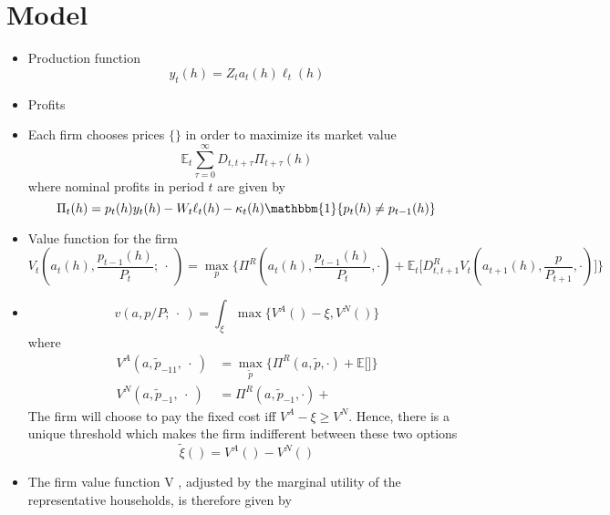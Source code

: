 \documentclass[a4paper,10pt]{article}  %
\begin{document}
\section{Model} %
\label{sec:model}
\begin{itemize}
   \item Production function
   \begin{equation}
      \label{eq:model_eq1}
      y_t(h) = Z_t a_t(h) \ell_t(h)
   \end{equation}

   \item Profits
   
   \item Each firm chooses prices $ \{\} $ in order to maximize its market value
   \begin{equation}
      \label{eq:model_eq}
      \mathbb{E}_t \sum_{\tau=0}^{\infty} D_{t,t+\tau} \Pi_{t+\tau} (h)
   \end{equation}
   where nominal profits in period $ t $ are given by
   \begin{equation}
      \label{eq:model_eq3}
      \Pi_t(h) = p_t(h) y_t(h) - W_t \ell_t(h) - \kappa_t(h) \mathbbm{1}\{p_t(h) \ne p_{t-1}(h)\}
   \end{equation}
   \item Value function for the firm
   \[
      V_t \left( a_t(h), \frac{ p_{t-1}(h) }{ P_t }; \ \cdot \ \right) = 
      \max_{p} 
      \bigg\{
         \Pi^R \left( a_t(h), \frac{ p_{t-1}(h) }{ P_t }, \cdot \right) + 
         \mathbb{E}_t \bigg[ D^R_{t,t+1} V_t \left( a_{t+1}(h), \frac{ p }{ P_{t+1} }, \cdot \right) \bigg]
      \bigg\}
   \]

   \item 
   \[
      v(a, p/P; \ \cdot \ ) = \int_{\xi} \max \Big\{ V^A(  ) - \xi , V^N( )  \Big\}
   \]
   where
   \begin{equation}
      \label{eq:model_eq4}
      \begin{split}
      V^A(a, \tilde{p}_{-11}, \ \cdot \ ) & = \max_{\tilde{p}} 
         \bigg\{ 
            \Pi^R \left( a, \tilde{p}, \cdot \right) + 
            \mathbb{E} \bigg[  \bigg]
         \bigg\} \\
      V^N(a, \tilde{p}_{-1}, \ \cdot \ ) & = 
          \Pi^R \left( a, \tilde{p}_{-1}, \cdot \right) + 
      \end{split}
   \end{equation}
   The firm will choose to pay the fixed cost iff $ V^A -\xi \ge V^N $. Hence,
   there is a unique threshold which makes the firm indifferent between these
   two options
   \[
      \tilde{\xi}( ) = V^A( ) - V^N( )
   \]

   \item The firm value function V , adjusted by the marginal utility of the representative households, is therefore given by
\end{itemize}
\end{document}
